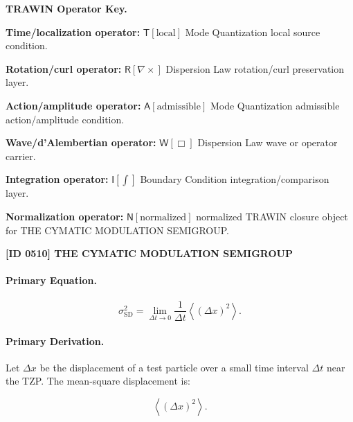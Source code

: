 \par\vspace{0.45\baselineskip}
\noindent\begin{minipage}[t]{\linewidth}
\begingroup
\small
\raggedright
\textbf{TRAWIN Operator Key.}\par
\noindent\textbf{Time/localization operator:} $\mathsf{T}\!\left[\mathrm{local}\right]$ Mode Quantization local source condition.\par
\noindent\textbf{Rotation/curl operator:} $\mathsf{R}\!\left[\nabla\times\right]$ Dispersion Law rotation/curl preservation layer.\par
\noindent\textbf{Action/amplitude operator:} $\mathsf{A}\!\left[\mathrm{admissible}\right]$ Mode Quantization admissible action/amplitude condition.\par
\noindent\textbf{Wave/d'Alembertian operator:} $\mathsf{W}\!\left[\Box\right]$ Dispersion Law wave or operator carrier.\par
\noindent\textbf{Integration operator:} $\mathsf{I}\!\left[\int\right]$ Boundary Condition integration/comparison layer.\par
\noindent\textbf{Normalization operator:} $\mathsf{N}\!\left[\mathrm{normalized}\right]$ normalized TRAWIN closure object for THE CYMATIC MODULATION SEMIGROUP.\par
\endgroup
\end{minipage}

\clearpage
\noindent\textbf{[ID 0510] THE CYMATIC MODULATION SEMIGROUP}\par
\vspace{0.35em}
\paragraph{Primary Equation.}
\begin{equation}
\sigma_{\mathrm{SD}}^{2}
=
\lim_{\Delta t\to 0}
\frac{1}{\Delta t}
\left\langle
(\Delta x)^2
\right\rangle .
\end{equation}

\paragraph{Primary Derivation.}
Let $\Delta x$ be the displacement of a test particle over a small time interval $\Delta t$ near the TZP.  
The mean-square displacement is:

\begin{equation}
\left\langle(\Delta x)^2\right\rangle .
\end{equation}

